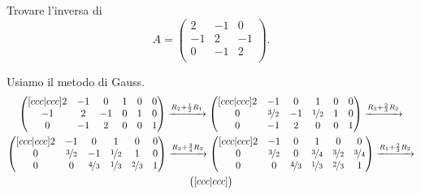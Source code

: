\begin{example}
    Trovare l'inversa di \[
        A = \begin{pmatrix}
            2  & -1 & 0 \\
            -1 & 2  & -1 \\
            0  & -1 & 2 \\
        \end{pmatrix}. 
    \]
\end{example}
\begin{solution}
    Usiamo il metodo di Gauss.
    \begin{gather*}
        \begin{pmatrix}[ccc|ccc]
            2  & -1 & 0  & 1 & 0 & 0\\
            -1 & 2  & -1 & 0 & 1 & 0\\
            0  & -1 & 2  & 0 & 0 & 1\\
        \end{pmatrix} \xrightarrow[]{R_2 + \frac12 R_1}
        \begin{pmatrix}[ccc|ccc]
            2 & -1      & 0  & 1        & 0 & 0\\
            0 & \nicefrac32 & -1 & \nicefrac12  & 1 & 0\\
            0 & -1      & 2  & 0        & 0 & 1\\
        \end{pmatrix} \xrightarrow[]{R_3 + \frac23 R_2} \\
        \begin{pmatrix}[ccc|ccc]
            2 & -1      & 0         & 1        & 0       & 0\\
            0 & \nicefrac32 & -1        & \nicefrac12  & 1       & 0\\
            0 & 0       & \nicefrac43   & \nicefrac13  & \nicefrac23 & 1\\
        \end{pmatrix} \xrightarrow[]{R_2 + \frac34 R_3}
        \begin{pmatrix}[ccc|ccc]
            2 & -1      & 0         & 1        & 0       & 0\\
            0 & \nicefrac32 & 0         & \nicefrac34  & \nicefrac32 & \nicefrac34\\
            0 & 0       & \nicefrac43   & \nicefrac13  & \nicefrac23 & 1\\
        \end{pmatrix} \xrightarrow[]{R_1 + \frac23 R_2}\\
        \begin{pmatrix}[ccc|ccc]

\end{pmatrix}
\end{gather*}
\end{solution}
